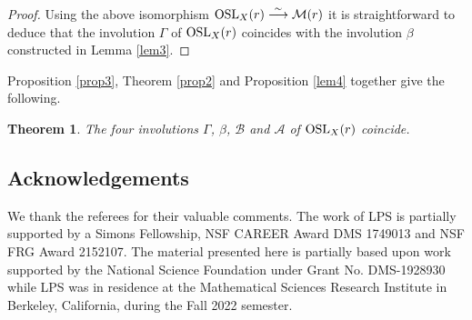 \documentclass[10pt,a4paper]{amsart}
\numberwithin{equation}{section}
\newtheorem{Theorem}{Theorem}[section]
\begin{document}
\begin{proof}
Using the above isomorphism ${\rm OSL}_X(r) \stackrel{\sim}{\longrightarrow} {\mathcal M}(r)$
it is straightforward to deduce that the involution $\Gamma$ of ${\rm OSL}_X(r)$
coincides with the involution $\beta$ constructed in Lemma \ref{lem3}.
\end{proof}

Proposition \ref{prop3}, Theorem \ref{prop2} and Proposition \ref{lem4}
together give the following.

\begin{Theorem}\label{cor3}
The four involutions $\Gamma$, $\beta$, $\mathcal B$ and ${\mathcal A}$ of
${\rm OSL}_X(r)$ coincide.
\end{Theorem}

\subsection*{Acknowledgements}

We thank the referees for their valuable comments.
The work of LPS is partially supported by a Simons Fellowship, NSF CAREER Award DMS 1749013 and NSF FRG Award 2152107. The material
presented here is partially based upon work supported by the National Science Foundation under Grant No. DMS-1928930 while LPS was in
residence at the Mathematical Sciences Research Institute in Berkeley, California, during the Fall 2022 semester.

\end{document}
